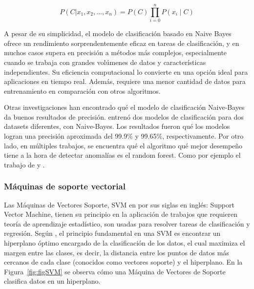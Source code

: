\documentclass[11pt,a4paper,spanish]{book}
\numberwithin{equation}{chapter}
\numberwithin{figure}{chapter}
\begin{document}
\begin{equation}\label{eq:eq1NaiveBayesProd}
P(C|x_1, x_2, ..., x_n) = P(C) \prod_{i = 0}^{n} P(x_i \mid C)
\end{equation}


A pesar de su simplicidad, el modelo de clasificación basado en Naive Bayes ofrece un rendimiento sorprendentemente eficaz en tareas de clasificación, y en muchos casos supera en precisión a métodos más complejos, especialmente cuando se trabaja con grandes volúmenes de datos y características independientes. Su eficiencia computacional lo convierte en una opción ideal para aplicaciones en tiempo real. Además, requiere una menor cantidad de datos para entrenamiento en comparación con otros algoritmos.


Otras investigaciones han encontrado qué el modelo de clasificación Naive-Bayes da buenos resultados de precisión. \cite{chen2016xgboost} entrenó dos modelos de clasificación para dos datasets diferentes, con Naive-Bayes. Los resultados fueron qué los modelos logran una precisión aproximada del 99.9\% y 99.65\%, respectivamente. Por otro lado, en múltiples trabajos, se encuentra qué el algoritmo qué mejor desempeño tiene a la hora de detectar anomalías es el random forest. Como por ejemplo el trabajo de \cite{sharma2022predictive} y \cite{yu2025tkeo}.


\subsubsection{Máquinas de soporte vectorial}

Las Máquinas de Vectores Soporte, SVM en por sus siglas en inglés: Support Vector Machine, tienen su principio en la aplicación de trabajos que requieren teoría de aprendizaje estadístico, son usadas para resolver tareas de clasificación y regresión. Según \cite{amat2017maquinas}, el principio fundamental en una SVM es encontrar un hiperplano óptimo encargado de la clasificación de los datos, el cual maximiza el margen entre las clases, es decir, la distancia entre los puntos de datos más cercanos de cada clase (conocidos como vectores soporte) y el hiperplano. En la Figura~\ref{fig:figSVM} se observa cómo una Máquina de Vectores de Soporte clasifica datos en un hiperplano. 
\end{document}
